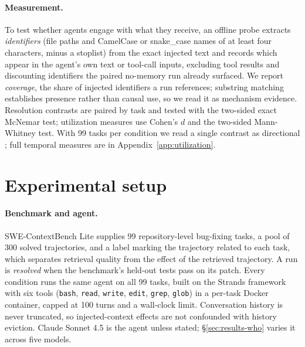 \documentclass{article}
\begin{document}
\paragraph{Measurement.}
\label{sec:method-utilization}
To test whether agents engage with what they receive, an offline probe extracts \emph{identifiers} (file paths and CamelCase or snake\_case names of at least four characters, minus a stoplist) from the exact injected text and records which appear in the agent's own text or tool-call inputs, excluding tool results and discounting identifiers the paired no-memory run already surfaced. We report \emph{coverage}, the share of injected identifiers a run references; substring matching establishes presence rather than causal use, so we read it as mechanism evidence. Resolution contrasts are paired by task and tested with the two-sided exact McNemar test; utilization measures use Cohen's $d$ and the two-sided Mann-Whitney test. With 99 tasks per condition we read a single contrast as directional ; full temporal measures are in Appendix~\ref{app:utilization}.
\label{sec:method-stats}

\section{Experimental setup}
\label{sec:setup}

\paragraph{Benchmark and agent.} SWE-ContextBench Lite \citep{zhang2026swecontextbench} supplies 99 repository-level bug-fixing tasks, a pool of 300 solved trajectories, and a label marking the trajectory related to each task, which separates retrieval quality from the effect of the retrieved trajectory. A run is \emph{resolved} when the benchmark's held-out tests pass on its patch. Every condition runs the same agent on all 99 tasks, built on the Strands framework with six tools (\texttt{bash}, \texttt{read}, \texttt{write}, \texttt{edit}, \texttt{grep}, \texttt{glob}) in a per-task Docker container, capped at 100 turns and a wall-clock limit. Conversation history is never truncated, so injected-context effects are not confounded with history eviction. Claude Sonnet 4.5 is the agent unless stated; \S\ref{sec:results-who} varies it across five models.
\end{document}
